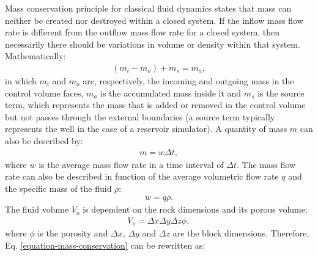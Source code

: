 Mass conservation principle for classical fluid dynamics states that mass can neither be created nor destroyed within a closed system. If the inflow mass flow rate is different from the outflow mass flow rate for a closed system, then necessarily there should be variations in volume or density within that system. Mathematically:
%
%
\begin{align}
	\label{equation-mass-conservation}
	(m_i-m_o)+m_s=m_a ,
\end{align}
%
in which $m_i$ and $m_o$ are, respectively, the incoming and outgoing mass in the control volume faces, $m_a$ is the accumulated mass inside it and $m_s$ is the source term, which represents the mass that is added or removed in the control volume but not passes through the external boundaries (a source term typically represents the well in the case of a reservoir simulator).
%
A quantity of mass $m$ can also be described by:
%
%
\begin{align}
	\label{equation-quantity-of-mass}
	m = w \Delta t ,
\end{align}
%
where $w$ is the average mass flow rate in a time interval of $\Delta t$. The mass flow rate can also be described in function of the average volumetric flow rate $q$ and the specific mass of the fluid $\rho$:
%
%
\begin{align}
	\label{equation-average-mass-flow-rate}
	w = q \rho.
\end{align}
%
The fluid volume $V_o$ is dependent on the rock dimensions and its porous volume:
%
%
\begin{align}
	\label{equation-porous-volume}
	V_o = \Delta x \Delta y \Delta z \phi,
\end{align}
%
where $\phi$ is the porosity and $\Delta x$, $\Delta y$ and $\Delta z$ are the block dimensions. Therefore, Eq. \ref{equation-mass-conservation} can be rewritten as:
